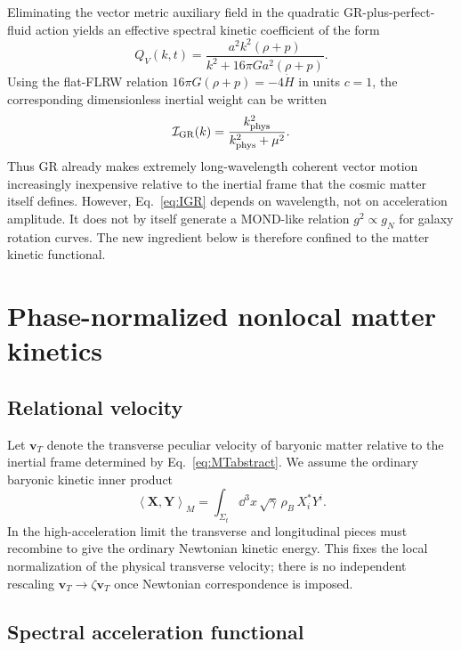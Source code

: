 \documentclass[11pt]{article}
\newcommand{\vT}{\bm{v}_{T}}
\newcommand{\avg}[1]{\left\langle #1\right\rangle}
\begin{document}
Eliminating the vector metric auxiliary field in the quadratic GR-plus-perfect-fluid action yields an effective spectral kinetic coefficient of the form \cite{DeFeliceProc}
\begin{equation}
    Q_V(k,t)=\frac{a^2k^2(\rho+p)}{k^2+16\pi G a^2(\rho+p)}.
\end{equation}
Using the flat-FLRW relation $16\pi G(\rho+p)=-4\dot H$ in units $c=1$, the corresponding dimensionless inertial weight can be written
\begin{equation}
    \mathcal I_{\rm GR}(k)=\frac{k_{\rm phys}^2}{k_{\rm phys}^2+\mu^2}.
    \label{eq:IGR}
\end{equation}
Thus GR already makes extremely long-wavelength coherent vector motion increasingly inexpensive relative to the inertial frame that the cosmic matter itself defines. However, Eq.~\eqref{eq:IGR} depends on wavelength, not on acceleration amplitude. It does not by itself generate a MOND-like relation $g^2\propto g_N$ for galaxy rotation curves. The new ingredient below is therefore confined to the matter kinetic functional.

\section{Phase-normalized nonlocal matter kinetics}

\subsection{Relational velocity}

Let $\vT$ denote the transverse peculiar velocity of baryonic matter relative to the inertial frame determined by Eq.~\eqref{eq:MTabstract}. We assume the ordinary baryonic kinetic inner product
\begin{equation}
    \avg{\bm X,\bm Y}_M
    =\int_{\Sigma_t}\dd^3x\,\sqrt{\gamma}\,\rho_B\,X_i^*Y^i.
\end{equation}
In the high-acceleration limit the transverse and longitudinal pieces must recombine to give the ordinary Newtonian kinetic energy. This fixes the local normalization of the physical transverse velocity; there is no independent rescaling $\vT\to \zeta\vT$ once Newtonian correspondence is imposed.

\subsection{Spectral acceleration functional}
\end{document}
